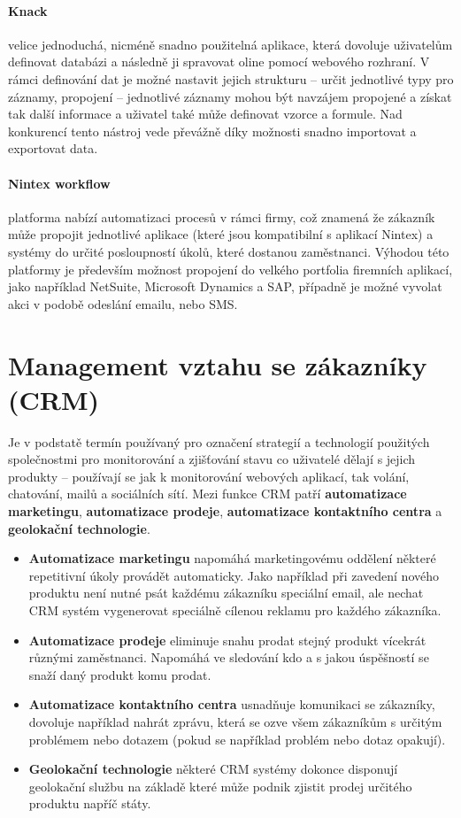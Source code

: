 \paragraph{Knack} velice jednoduchá, nicméně snadno použitelná aplikace, která dovoluje uživatelům definovat databázi a následně ji spravovat oline pomocí webového rozhraní. V rámci definování dat je možné nastavit jejich strukturu -- určit jednotlivé typy pro záznamy, propojení -- jednotlivé záznamy mohou být navzájem propojené a získat tak další informace a uživatel také může definovat vzorce a formule. Nad konkurencí tento nástroj vede převážně díky možnosti snadno importovat a exportovat data.

\paragraph{Nintex workflow} platforma nabízí automatizaci procesů v rámci firmy, což znamená že zákazník může propojit jednotlivé aplikace (které jsou kompatibilní s aplikací Nintex) a systémy do určité posloupností úkolů, které dostanou zaměstnanci. Výhodou této platformy je především možnost propojení do velkého portfolia firemních aplikací, jako například NetSuite, Microsoft Dynamics a SAP, případně je možné vyvolat akci v podobě odeslání emailu, nebo SMS.

\section{Management vztahu se zákazníky (CRM)}
\par Je v podstatě termín používaný pro označení strategií a technologií použitých společnostmi pro monitorování a zjišťování stavu co uživatelé dělají s jejich produkty -- používají se jak k monitorování webových aplikací, tak volání, chatování, mailů a sociálních sítí. Mezi funkce CRM patří \textbf{automatizace marketingu}, \textbf{automatizace prodeje}, \textbf{automatizace kontaktního centra} a \textbf{geolokační technologie}. \cite{crm}

\begin{itemize}
\item \textbf{Automatizace marketingu} napomáhá marketingovému oddělení některé repetitivní úkoly provádět automaticky. Jako například při zavedení nového produktu není nutné psát každému zákazníku speciální email, ale nechat CRM systém vygenerovat speciálně cílenou reklamu pro každého zákazníka.
\item \textbf{Automatizace prodeje} eliminuje snahu prodat stejný produkt vícekrát různými zaměstnanci. Napomáhá ve sledování kdo a s jakou úspěšností se snaží daný produkt komu prodat.
\item \textbf{Automatizace kontaktního centra} usnadňuje komunikaci se zákazníky, dovoluje například nahrát zprávu, která se ozve všem zákazníkům s určitým problémem nebo dotazem (pokud se například problém nebo dotaz opakují).
\item \textbf{Geolokační technologie} některé CRM systémy dokonce disponují geolokační službu na základě které může podnik zjistit prodej určitého produktu napříč státy. \cite{crm}
\end{itemize}

